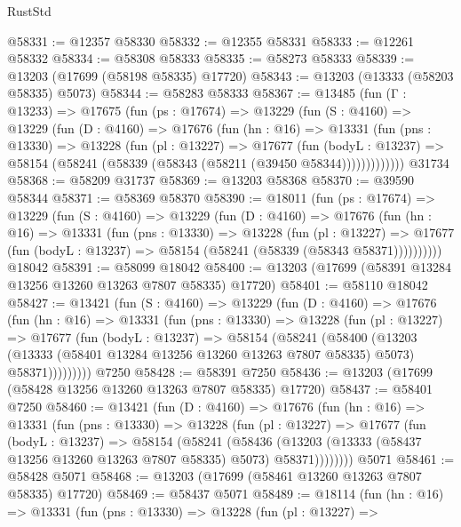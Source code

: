\begin{lexlean}{RustStd}
\begin{coremodule}
@58331 := @12357 @58330
@58332 := @12355 @58331
@58333 := @12261 @58332
@58334 := @58308 @58333
@58335 := @58273 @58333
@58339 := @13203 (@17699 (@58198 @58335) @17720)
@58343 := @13203 (@13333 (@58203 @58335) @5073)
@58344 := @58283 @58333
@58367 := @13485
    (fun (Γ : @13233) =>
    @17675
      (fun (ps : @17674) =>
      @13229
        (fun (S : @4160) =>
        @13229
          (fun (D : @4160) =>
          @17676
            (fun (hn : @16) =>
            @13331
              (fun (pns : @13330) =>
              @13228
                (fun (pl : @13227) =>
                @17677
                  (fun (bodyL : @13237) =>
                  @58154 (@58241 (@58339 (@58343 (@58211 (@39450 @58344)))))))))))))
    @31734
@58368 := @58209 @31737
@58369 := @13203 @58368
@58370 := @39590 @58344
@58371 := @58369 @58370
@58390 := @18011
    (fun (ps : @17674) =>
    @13229
      (fun (S : @4160) =>
      @13229
        (fun (D : @4160) =>
        @17676
          (fun (hn : @16) =>
          @13331
            (fun (pns : @13330) =>
            @13228
              (fun (pl : @13227) =>
              @17677 (fun (bodyL : @13237) => @58154 (@58241 (@58339 (@58343 @58371))))))))))
    @18042
@58391 := @58099 @18042
@58400 := @13203 (@17699 (@58391 @13284 @13256 @13260 @13263 @7807 @58335) @17720)
@58401 := @58110 @18042
@58427 := @13421
    (fun (S : @4160) =>
    @13229
      (fun (D : @4160) =>
      @17676
        (fun (hn : @16) =>
        @13331
          (fun (pns : @13330) =>
          @13228
            (fun (pl : @13227) =>
            @17677
              (fun (bodyL : @13237) =>
              @58154
                (@58241
                  (@58400
                    (@13203
                      (@13333 (@58401 @13284 @13256 @13260 @13263 @7807 @58335) @5073)
                      @58371)))))))))
    @7250
@58428 := @58391 @7250
@58436 := @13203 (@17699 (@58428 @13256 @13260 @13263 @7807 @58335) @17720)
@58437 := @58401 @7250
@58460 := @13421
    (fun (D : @4160) =>
    @17676
      (fun (hn : @16) =>
      @13331
        (fun (pns : @13330) =>
        @13228
          (fun (pl : @13227) =>
          @17677
            (fun (bodyL : @13237) =>
            @58154
              (@58241
                (@58436
                  (@13203 (@13333 (@58437 @13256 @13260 @13263 @7807 @58335) @5073) @58371))))))))
    @5071
@58461 := @58428 @5071
@58468 := @13203 (@17699 (@58461 @13260 @13263 @7807 @58335) @17720)
@58469 := @58437 @5071
@58489 := @18114
    (fun (hn : @16) =>
    @13331
      (fun (pns : @13330) =>
      @13228
        (fun (pl : @13227) =>

\end{coremodule}
\end{lexlean}
